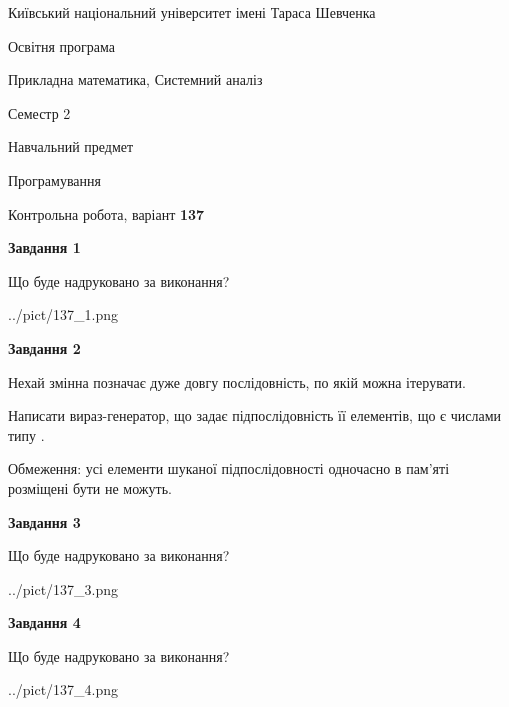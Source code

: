 \documentclass[12pt, ukrainian]{article}
\begin{document}
{{\begin {small}\par
{ \center  Київський національний університет імені Тараса Шевченка \par}
{\parbox {5 cm}{Освітня програма \hfill}{\parbox {8 cm}{Прикладна математика, Системний аналіз \hfill}}\parbox {5 cm}{\hfill Семестр 2}}\par
{\parbox {5 cm} {Навчальний предмет \hfill}\parbox {7 cm}{Програмування \hfill}\parbox {6cm}{\hfill}\par}\vspace{-7pt} \end{small}}{\center Контрольна робота, варіант  \No \textbf
{ 137 }\par}}
{
\begin {large}
{\begin {center}\textbf{Завдання 1}\end {center}}\par
Що буде надруковано за виконання?\par\par
\begin{center}
	{../pict/137_1.png}
\end{center}
\newpage

{\begin {center}\textbf{Завдання 2}\end {center}}\par
Нехай змінна  позначає дуже довгу послідовність, по якій можна ітерувати.

Написати вираз-генератор, що задає підпослідовність її елементів, що є числами типу .

Обмеження: усі елементи шуканої підпослідовності одночасно в пам'яті розміщені бути не можуть.\par
\newpage

{\begin {center}\textbf{Завдання 3}\end {center}}\par
Що буде надруковано за виконання?
\begin{center}
	{../pict/137_3.png}
\end{center}
\newpage

{\begin {center}\textbf{Завдання 4}\end {center}}\par
Що буде надруковано за виконання?\par
\begin{center}
	{../pict/137_4.png}
\end{center}
\newpage


\end{large}}
\end{document}

